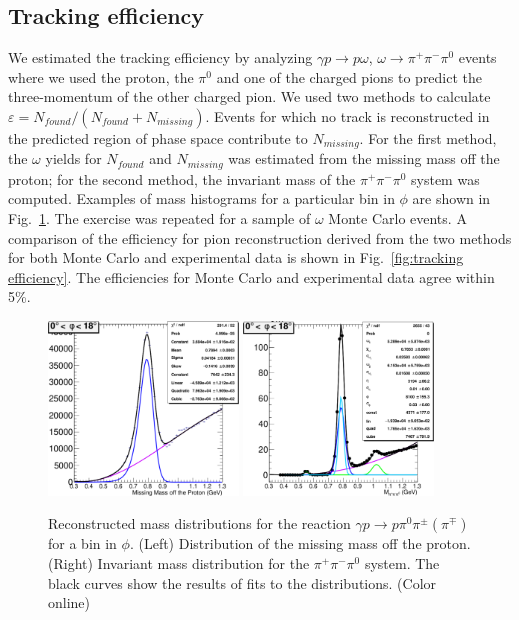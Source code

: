 \subsection{Tracking efficiency}

We estimated the tracking efficiency by analyzing $\gamma p \rightarrow p \omega$, $\omega\rightarrow\pi^+\pi^-\pi^0$ events where we used the proton, the $\pi^0$ and one of the charged pions to predict the three-momentum of the other charged pion. We used two methods to calculate $\varepsilon=N_{found}/(N_{found}+N_{missing})$.  Events for which no track is reconstructed in the predicted region of 
phase space contribute to $N_{missing}$.  For the first method, the $\omega$ yields for $N_{found}$ and $N_{missing}$ was estimated from the missing mass off the 
proton; for the second method, the invariant mass of the $\pi^+\pi^-\pi^0$ system was computed.  Examples of mass histograms for a particular bin in $\phi$ are shown in Fig.~\ref{fig:omega mass}.  The exercise was repeated for a sample of $\omega$ Monte Carlo events.   A comparison of the efficiency for pion reconstruction derived from the 
two methods for both Monte Carlo and experimental data is shown in Fig.~\ref{fig:tracking efficiency}.  The efficiencies for Monte Carlo and experimental data 
agree within 5\%.

\begin{figure}[tbp]
\begin{center}
\includegraphics[width=0.45\textwidth]{figures/MissingOmegaFit.pdf}
\includegraphics[width=0.45\textwidth]{figures/ThreePiFit.pdf}
\caption{\label{fig:omega mass}
Reconstructed mass distributions for the reaction $\gamma p \to p\pi^0\pi^{\pm}(\pi^\mp)$ for a bin in $\phi$.
  (Left) Distribution of the missing mass off the proton.
(Right) Invariant mass distribution for the $\pi^+\pi^-\pi^0$ system.  The black
curves show the results of fits to the distributions.
 (Color online)}
\end{center}
\end{figure}


